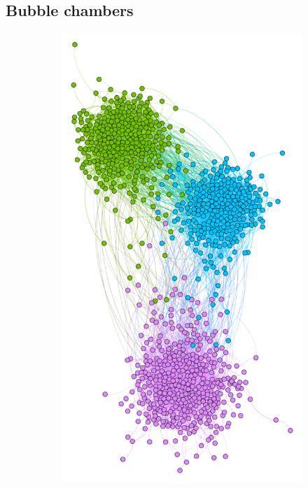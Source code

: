 \subsection{Bubble chambers}
\begin{figure}

  \centering
  \begin{subfigure}[t]{0.25\textwidth}
    \includegraphics[width=\textwidth]{img/dim3_mod.pdf}

\end{subfigure}
\end{figure}
